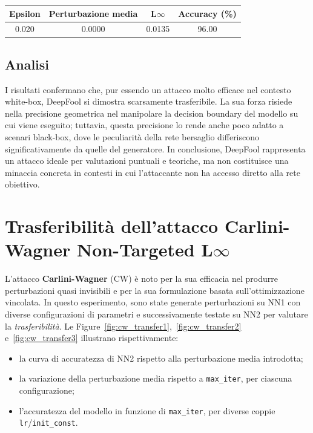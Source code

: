             \begin{center}
                \begin{tabular}{cccc}
                    \toprule
                    \textbf{Epsilon} & \textbf{Perturbazione media} & \textbf{L$\infty$} & \textbf{Accuracy (\%)} \\
                    \midrule
                    0.020 & 0.0000 & 0.0135 & 96.00 \\
                    \bottomrule
                \end{tabular}
            \end{center}

        \subsection{Analisi}
            I risultati confermano che, pur essendo un attacco molto efficace nel contesto white-box, DeepFool si dimostra scarsamente trasferibile. La sua forza risiede nella precisione geometrica nel manipolare la decision boundary del modello su cui viene eseguito; tuttavia, questa precisione lo rende anche poco adatto a scenari black-box, dove le peculiarità della rete bersaglio differiscono significativamente da quelle del generatore.
            In conclusione, DeepFool rappresenta un attacco ideale per valutazioni puntuali e teoriche, ma non costituisce una minaccia concreta in contesti in cui l’attaccante non ha accesso diretto alla rete obiettivo.

    \section{Trasferibilità dell'attacco Carlini-Wagner Non-Targeted L$\infty$}
        L’attacco \textbf{Carlini-Wagner} (CW) è noto per la sua efficacia nel produrre perturbazioni quasi invisibili e per la sua formulazione basata sull’ottimizzazione vincolata. In questo esperimento, sono state generate perturbazioni su NN1 con diverse configurazioni di parametri e successivamente testate su NN2 per valutare la \textit{trasferibilità}.
        Le Figure~\ref{fig:cw_transfer1},~\ref{fig:cw_transfer2} e~\ref{fig:cw_transfer3} illustrano rispettivamente:
        \begin{itemize}
          \item la curva di accuratezza di NN2 rispetto alla perturbazione media introdotta;
          
          \item la variazione della perturbazione media rispetto a \texttt{max\_iter}, per ciascuna configurazione;
          
          \item l’accuratezza del modello in funzione di \texttt{max\_iter}, per diverse coppie \texttt{lr}/\texttt{init\_const}.
        \end{itemize}

